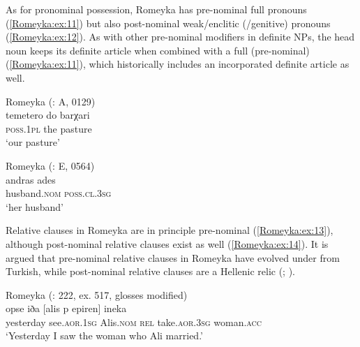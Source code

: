 \documentclass[output=paper,colorlinks,citecolor=brown]{langscibook}
\begin{document}
\begin{sloppypar}
As for pronominal possession, Romeyka has pre-nominal full  pronouns (\ref{Romeyka:ex:11}) but also post-nominal weak/enclitic (/genitive) pronouns (\ref{Romeyka:ex:12}).{\footnotemark} As with other pre-nominal modifiers in definite NPs, the head noun keeps its definite article when combined with a full (pre-nominal)   (\ref{Romeyka:ex:11}), which historically includes an incorporated definite article as well.
\end{sloppypar}


\ea\label{Romeyka:ex:11}
Romeyka (\citealt{schreiber2021pontic}: A, 0129) \\
\gll temetero do barχari \\
\textsc{poss.1pl} the pasture \\
\glt `our pasture'
\z


\ea\label{Romeyka:ex:12}
Romeyka (\citealt{schreiber2021pontic}: E, 0564) \\
\gll andras ades \\
husband\textsc{.nom} \textsc{poss.cl.3sg}\\
\glt `her husband'  \\
\z

Relative clauses in Romeyka are in principle pre-nominal (\ref{Romeyka:ex:13}), although post-nominal relative clauses exist as well (\ref{Romeyka:ex:14}). It is argued that pre-nominal relative clauses in Romeyka have evolved under  from Turkish, while post-nominal relative clauses are a Hellenic relic (\citealt{neocleous_word_2020}; \citealt{schreibergrammar2022}).

\ea\label{Romeyka:ex:13}
Romeyka (\citealt{gandon2016}: 222, ex. 517, glosses modified) \\
\gll opse iða [alis p epiren] ineka \\
yesterday see\textsc{.aor.1sg} Alis\textsc{.nom} \textsc{rel} take\textsc{.aor.3sg} woman\textsc{.acc} \\
\glt `Yesterday I saw the woman who Ali married.'  \\
\z
\end{document}
